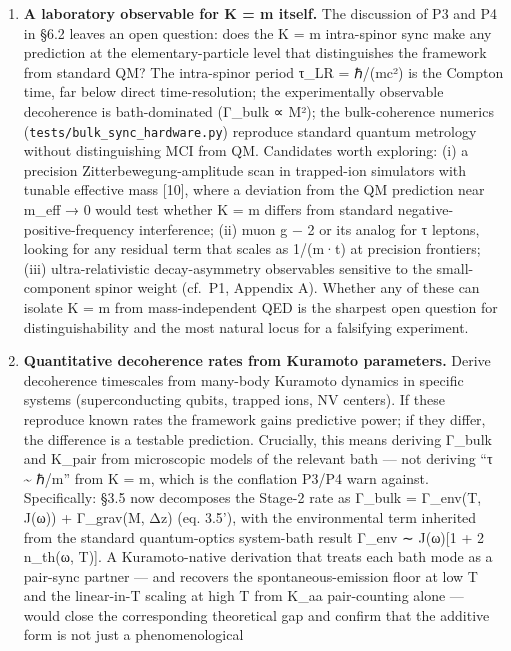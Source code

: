 \documentclass[
]{article}
\begin{document}
\begin{enumerate}
\def\labelenumi{\arabic{enumi}.}
\item
  \textbf{A laboratory observable for K = m itself.} The discussion of
  P3 and P4 in §6.2 leaves an open question: does the K = m intra-spinor
  sync make any prediction at the elementary-particle level that
  distinguishes the framework from standard QM? The intra-spinor period
  τ\_LR = ℏ/(mc²) is the Compton time, far below direct time-resolution;
  the experimentally observable decoherence is bath-dominated (Γ\_bulk ∝
  M²); the bulk-coherence numerics
  (\texttt{tests/bulk\_sync\_hardware.py}) reproduce standard quantum
  metrology without distinguishing MCI from QM. Candidates worth
  exploring: (i) a precision Zitterbewegung-amplitude scan in
  trapped-ion simulators with tunable effective mass {[}10{]}, where a
  deviation from the QM prediction near m\_eff → 0 would test whether K
  = m differs from standard negative-positive-frequency interference;
  (ii) muon g − 2 or its analog for τ leptons, looking for any residual
  term that scales as 1/(m·t) at precision frontiers; (iii)
  ultra-relativistic decay-asymmetry observables sensitive to the
  small-component spinor weight (cf.~P1, Appendix A). Whether any of
  these can isolate K = m from mass-independent QED is the sharpest open
  question for distinguishability and the most natural locus for a
  falsifying experiment.
\item
  \textbf{Quantitative decoherence rates from Kuramoto parameters.}
  Derive decoherence timescales from many-body Kuramoto dynamics in
  specific systems (superconducting qubits, trapped ions, NV centers).
  If these reproduce known rates the framework gains predictive power;
  if they differ, the difference is a testable prediction. Crucially,
  this means deriving Γ\_bulk and K\_pair from microscopic models of the
  relevant bath --- not deriving ``τ \textasciitilde{} ℏ/m'' from K = m,
  which is the conflation P3/P4 warn against. Specifically: §3.5 now
  decomposes the Stage-2 rate as Γ\_bulk = Γ\_env(T, J(ω)) + Γ\_grav(M,
  Δz) (eq. 3.5'), with the environmental term inherited from the
  standard quantum-optics system-bath result Γ\_env ∼ J(ω){[}1 + 2
  n\_th(ω, T){]}. A Kuramoto-native derivation that treats each bath
  mode as a pair-sync partner --- and recovers the spontaneous-emission
  floor at low T and the linear-in-T scaling at high T from K\_aa
  pair-counting alone --- would close the corresponding theoretical gap
  and confirm that the additive form is not just a phenomenological

\end{enumerate}
\end{document}
